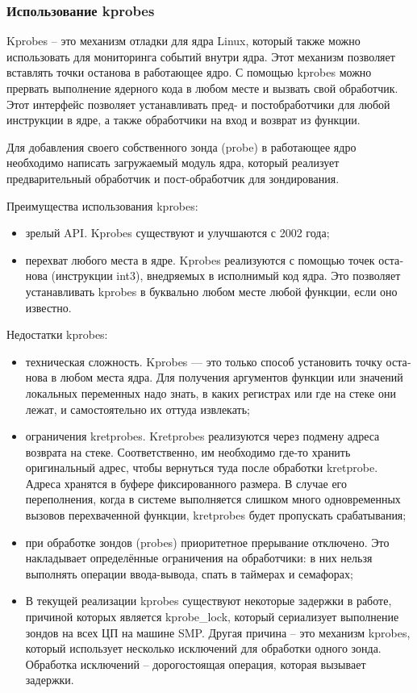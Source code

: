 \documentclass[a4paper,14pt]{article}
\begin{document}
\subsubsection{Использование kprobes}

Kprobes -- это механизм отладки для ядра Linux, который также можно использовать для мониторинга событий внутри ядра. Этот механизм позволяет вставлять точки останова в работающее ядро.
С помощью kprobes можно прервать выполнение ядерного кода в любом месте и вызвать свой обработчик.
Этот интерфейс позволяет устанавливать пред- и постобработчики для любой инструкции в ядре, а также обработчики на вход и возврат из функции.

Для добавления своего собственного зонда (probe) в работающее ядро необходимо написать загружаемый модуль ядра, который реализует предварительный обработчик и пост-обработчик для зондирования.

Преимущества использования kprobes:

\begin{itemize}
	\item зрелый API. Kprobes существуют и улучшаются с 2002 года;
	\item перехват любого места в ядре. Kprobes реализуются с помощью точек оста­нова (инструкции int3), внедряемых в исполнимый код ядра. Это позволяет устанав­ливать kprobes в буквально любом месте любой функции, если оно известно.
\end{itemize}

Недостатки kprobes:

\begin{itemize}
	\item техническая сложность. Kprobes — это только способ установить точку оста­нова в любом места ядра. Для получения аргументов функции или значений ло­кальных переменных надо знать, в каких регистрах или где на стеке они лежат, и самостоятельно их оттуда извлекать;
	\item ограничения kretprobes. Kretprobes реализуются через подмену адреса возврата на стеке. Соответственно, им необходимо где-то хранить оригинальный адрес, чтобы вернуться туда после обработки kretprobe. Адреса хранятся в буфере фиксированного размера. В случае его переполнения, когда в системе выполняется слишком много одновременных вызовов перехваченной функции, kretprobes будет пропускать срабатывания;
	\item при обработке зондов (probes) приоритетное прерывание отключено. Это накладывает определённые ограничения на обработчики: в них нельзя выполнять операции ввода-вывода, спать в таймерах и семафорах;
	\item В текущей реализации kprobes существуют некоторые задержки в работе, причиной которых является kprobe\_lock, который сериализует выполнение зондов на всех ЦП на машине SMP. Другая причина -- это механизм kprobes, который использует несколько исключений для обработки одного зонда. Обработка исключений -- дорогостоящая операция, которая вызывает задержки. 
\end{itemize}
\end{document}

